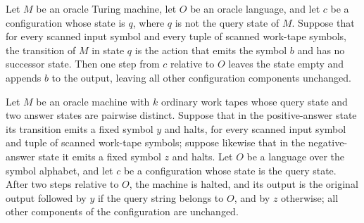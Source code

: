 \begin{theorem}
\label{Turing.OracleTM.step_of_answerAction}
\leanok
{}
Let $M$ be an oracle Turing machine, let $O$ be an oracle language, and let $c$ be a
configuration whose state is $q$, where $q$ is not the query state of $M$. Suppose that
for every scanned input symbol and every tuple of scanned work-tape symbols, the
transition of $M$ in state $q$ is the action that emits the symbol $b$ and has no
successor state. Then one step from $c$ relative to $O$ leaves the state empty and
appends $b$ to the output, leaving all other configuration components unchanged.
\end{theorem}

\begin{theorem}
\label{Turing.OracleTM.runFrom_two_of_qQuery}
\leanok
{}
Let $M$ be an oracle machine with $k$ ordinary work tapes whose query state and two
answer states are pairwise distinct. Suppose that in the positive-answer state its
transition emits a fixed symbol $y$ and halts, for every scanned input symbol and tuple
of scanned work-tape symbols; suppose likewise that in the negative-answer state it
emits a fixed symbol $z$ and halts. Let $O$ be a language over the symbol alphabet, and
let $c$ be a configuration whose state is the query state. After two steps relative to
$O$, the machine is halted, and its output is the original output followed by $y$ if the
query string belongs to $O$, and by $z$ otherwise; all other components of the
configuration are unchanged.
\end{theorem}

